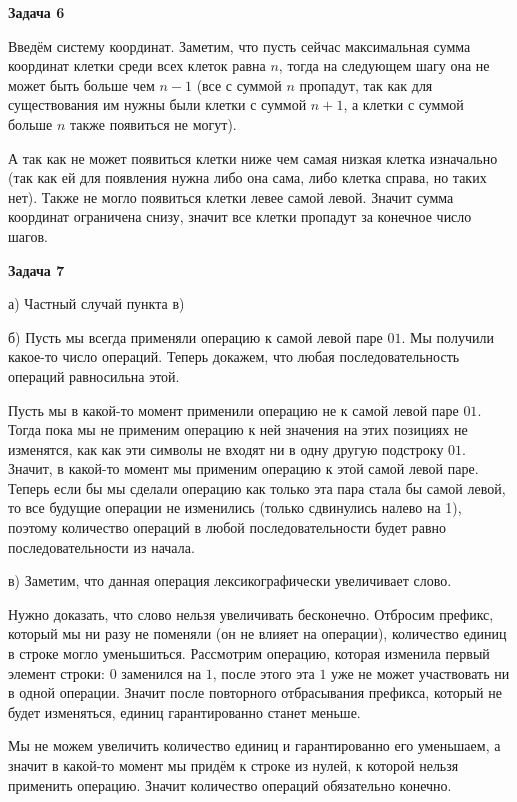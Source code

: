 \begin{center}
\textbf{Задача 6}
\end{center}
Введём систему координат. Заметим, что пусть сейчас максимальная сумма координат клетки среди всех клеток равна $\displaystyle n$, тогда на следующем шагу она не может быть больше чем $\displaystyle n-1$ (все с суммой $\displaystyle n$ пропадут, так как для существования им нужны были клетки с суммой $\displaystyle n+1$, а клетки с суммой больше $\displaystyle n$ также появиться не могут).

А так как не может появиться клетки ниже чем самая низкая клетка изначально (так как ей для появления нужна либо она сама, либо клетка справа, но таких нет). Также не могло появиться клетки левее самой левой. Значит сумма координат ограничена снизу, значит все клетки пропадут за конечное число шагов.

\begin{center}
\textbf{Задача 7}
\end{center}
а) Частный случай пункта в)

б) Пусть мы всегда применяли операцию к самой левой паре $\displaystyle 01$. Мы получили какое-то число операций. Теперь докажем, что любая последовательность операций равносильна этой.

Пусть мы в какой-то момент применили операцию не к самой левой паре $\displaystyle 01$. Тогда пока мы не применим операцию к ней значения на этих позициях не изменятся, как как эти символы не входят ни в одну другую подстроку $\displaystyle 01$. Значит, в какой-то момент мы применим операцию к этой самой левой паре. Теперь если бы мы сделали операцию как только эта пара стала бы самой левой, то все будущие операции не изменились (только сдвинулись налево на 1), поэтому количество операций в любой последовательности будет равно последовательности из начала.

в) Заметим, что данная операция лексикографически увеличивает слово.

Нужно доказать, что слово нельзя увеличивать бесконечно. Отбросим префикс, который мы ни разу не поменяли (он не влияет на операции), количество единиц в строке могло уменьшиться. Рассмотрим операцию, которая изменила первый элемент строки: $\displaystyle 0$ заменился на $\displaystyle 1$, после этого эта $\displaystyle 1$ уже не может участвовать ни в одной операции. Значит после повторного отбрасывания префикса, который не будет изменяться, единиц гарантированно станет меньше.

Мы не можем увеличить количество единиц и гарантированно его уменьшаем, а значит в какой-то момент мы придём к строке из нулей, к которой нельзя применить операцию. Значит количество операций обязательно конечно.